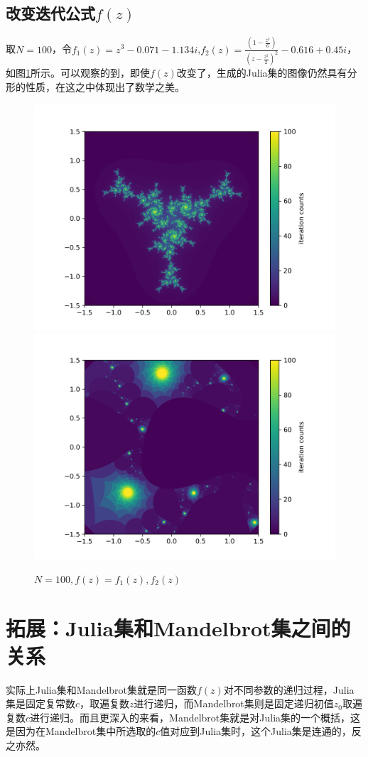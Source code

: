 \documentclass[a4paper]{ctexart}
\begin{document}
\subsection{改变迭代公式$f(z)$}
取$N=100$，令$f_1(z)=z^3-0.071-1.134i$,$\displaystyle f_2(z)=\frac{(1-\frac{z^3}{6})}{(z-\frac{z^2}{2})^2}-0.616+0.45i$\cite{julia_wiki}，如图\ref{tu4}所示。可以观察的到，即使$f(z)$改变了，生成的Julia集的图像仍然具有分形的性质，在这之中体现出了数学之美。
\begin{figure}[H]
	\centering
	\includegraphics[width=.45\textwidth]{./png/300dpi/julia_f1_N100.png}
	\includegraphics[width=.45\textwidth]{./png/300dpi/julia_f2_N100.png}
	\caption{$N=100,f(z)=f_1(z),f_2(z)$}
	\label{tu4}
\end{figure}

\section{拓展：Julia集和Mandelbrot集之间的关系}
实际上Julia集和Mandelbrot集就是同一函数$f(z)$对不同参数的递归过程，Julia集是固定复常数$c$，取遍复数$z$进行递归，而Mandelbrot集则是固定递归初值$z_0$取遍复数$c$进行递归。而且更深入的来看，Mandelbrot集就是对Julia集的一个概括\cite{julia_zhihuRe}，这是因为在Mandelbrot集中所选取的$c$值对应到Julia集时，这个Julia集是连通的，反之亦然。\cite{julia_Ju}
\end{document}
